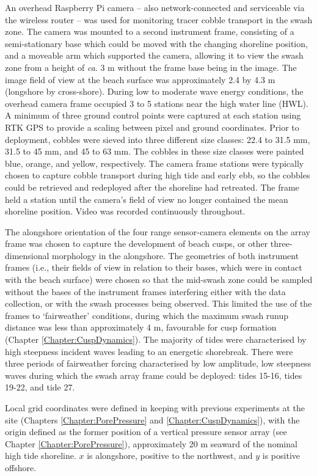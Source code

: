 An overhead Raspberry Pi camera -- also network-connected and serviceable via the wireless router -- was used for monitoring tracer cobble transport in the swash zone. The camera was mounted to a second instrument frame, consisting of a semi-stationary base which could be moved with the changing shoreline position, and a moveable arm which supported the camera, allowing it to view the swash zone from a height of \textit{ca}. 3 m without the frame base being in the image. The image field of view at the beach surface was approximately 2.4 by 4.3 m (longshore by cross-shore). During low to moderate wave energy conditions, the overhead camera frame occupied 3 to 5 stations near the high water line (HWL). A minimum of three ground control points were captured at each station using RTK GPS to provide a scaling between pixel and ground coordinates. Prior to deployment, cobbles were sieved into three different size classes: 22.4 to 31.5 mm, 31.5 to 45 mm, and 45 to 63 mm. The cobbles in these size classes were painted blue, orange, and yellow, respectively. The camera frame stations were typically chosen to capture cobble transport during high tide and early ebb, so the cobbles could be retrieved and redeployed after the shoreline had retreated. The frame held a station until the camera's field of view no longer contained the mean shoreline position. Video was recorded continuously throughout.  
  
The alongshore orientation of the four range sensor-camera elements on the array frame was chosen to capture the development of beach cusps, or other three-dimensional morphology in the alongshore. The geometries of both instrument frames (i.e., their fields of view in relation to their bases, which were in contact with the beach surface) were chosen so that the mid-swash zone could be sampled without the bases of the instrument frames interfering either with the data collection, or with the swash processes being observed. This limited the use of the frames to `fairweather' conditions, during which the maximum swash runup distance was less than approximately 4 m, favourable for cusp formation (Chapter \ref{Chapter:CuspDynamics}). The majority of tides were characterised by high steepness incident waves leading to an energetic shorebreak. There were three periods of fairweather forcing characterised by low amplitude, low steepness waves during which the swash array frame could be deployed: tides 15-16, tides 19-22, and tide 27.

Local grid coordinates were defined in keeping with previous experiments at the site (Chapters \ref{Chapter:PorePressure} and \ref{Chapter:CuspDynamics}), with the origin defined as the former position of a vertical pressure sensor array (see Chapter \ref{Chapter:PorePressure}), approximately 20 m seaward of the nominal high tide shoreline. $x$ is alongshore, positive to the northwest, and $y$ is positive offshore.

